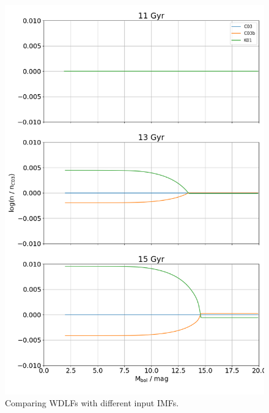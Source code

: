 \documentclass[fleqn,usenatbib]{rasti}
\begin{document}
\begin{figure}
    \centering
    \includegraphics[width=\columnwidth]{wdlf_compare_imf.png}
    \caption{Comparing WDLFs with different input IMFs.}
    \label{fig:wdlf_compare_imf}
\end{figure}
\end{document}
